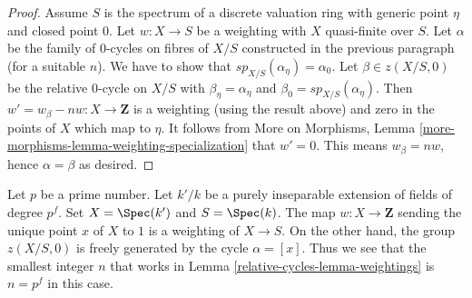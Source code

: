 \begin{proof}
\medskip\noindent
Assume $S$ is the spectrum of a discrete valuation ring with generic
point $\eta$ and closed point $0$. Let $w : X \to S$ be a weighting with
$X$ quasi-finite over $S$. Let $\alpha$ be the family of $0$-cycles on
fibres of $X/S$ constructed in the previous paragraph (for a suitable $n$).
We have to show that $sp_{X/S}(\alpha_\eta) = \alpha_0$.
Let $\beta \in z(X/S, 0)$ be the relative $0$-cycle on $X/S$
with $\beta_\eta = \alpha_\eta$ and $\beta_0 = sp_{X/S}(\alpha_\eta)$.
Then $w' = w_\beta - nw : X \to \mathbf{Z}$
is a weighting (using the result above) and zero in the points of $X$
which map to $\eta$. It follows from More on Morphisms,
Lemma \ref{more-morphisms-lemma-weighting-specialization}
that $w' = 0$. This means $w_\beta = nw$, hence $\alpha = \beta$ as desired.
\end{proof}

\begin{example}
\label{relative-cycles-example-n-must-be-positive-sometimes}

Let $p$ be a prime number. Let $k'/k$ be a purely inseparable extension
of fields of degree $p^f$. Set $X = \Spec(k')$ and $S = \Spec(k)$.
The map $w : X \to \mathbf{Z}$ sending the unique point $x$ of $X$ to $1$
is a weighting of $X \to S$. On the other hand,
the group $z(X/S, 0)$ is freely generated by the cycle $\alpha = [x]$.
Thus we see that the smallest integer $n$ that works in
Lemma \ref{relative-cycles-lemma-weightings} is $n = p^f$ in this case.
\end{example}

